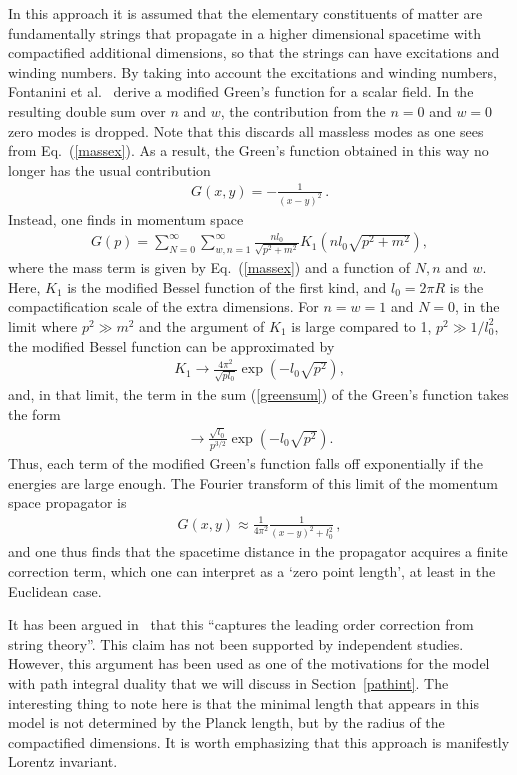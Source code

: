 \documentclass{article}
\def\beqn{\begin{eqnarray}}
\def\eeqn{\end{eqnarray}}
\begin{document}
In this approach it is assumed that the elementary constituents of matter are fundamentally strings 
that propagate in a higher dimensional spacetime with compactified additional dimensions, so that the strings
can have excitations and winding numbers. By taking into account the 
excitations and winding numbers, Fontanini et al.~\cite{Smailagic:2003hm,Fontanini:2005ik,Spallucci:2005bm} 
derive a modified Green's function for a
scalar field. In the resulting double sum over $n$ and $w$, the contribution from the $n=0$
and $w=0$ zero modes is dropped. Note that this discards all massless modes as one sees from Eq.~(\ref{massex}). 
As a result, the Green's function obtained in this way 
no longer has the usual contribution
\beqn
G(x,y) = - \frac{1}{(x-y)^2} \,.
\eeqn
Instead, one finds in momentum space
\beqn
G(p) = \sum_{N=0}^\infty \sum_{w,n=1}^\infty \frac{n l_0}{\sqrt{p^2 +
    m^2}} K_1 \left( n l_0 \sqrt{p^2 + m^2} \right) , \label{greensum}
\eeqn
where the mass term is given by Eq.~(\ref{massex}) and a function of $N,n$ and $w$. 
Here, $K_1$ is the modified Bessel function of the first kind, and $l_0 = 2\pi R$ is the compactification scale of the extra dimensions.
For $n=w=1$ and $N=0$, in the limit where $p^2 \gg m^2$ and the argument of $K_1$ is large compared to 1, $p^2 \gg 1/l^2_0$, the modified Bessel function can
be approximated by
\beqn
K_1 \to \frac{4 \pi^2}{\sqrt{p l_0}}  \exp \left( -l_0 \sqrt{p^2} \right),
\eeqn
and, in that limit, the term in the sum (\ref{greensum}) of the Green's function takes the form 
\beqn
\to \frac{\sqrt{l_0}}{p^{3/2}} \exp \left (-l_0 \sqrt{p^2} \right) .
\eeqn
Thus, each term of the modified Green's function falls off exponentially if the energies are large enough. 
The Fourier transform of this limit of the momentum space propagator is
\beqn
G(x,y) \approx \frac{1}{4 \pi^2} \frac{1}{(x-y)^2 + l_0^2} \,, \label{greens}
\eeqn
and one thus finds that the spacetime distance in the propagator acquires a finite correction term, which one can
interpret as a `zero point length', at least in the Euclidean case. 

It has been argued in~\cite{Smailagic:2003hm} that this ``captures the leading order correction from string theory''. 
This claim has not been supported by independent studies. However, this argument has been used as one of the motivations
for the model with path integral duality that we will discuss in Section~\ref{pathint}. The interesting thing to note here is
that the minimal length that appears in this model is not determined by the Planck length, but by the radius of
the compactified dimensions. It is worth emphasizing that this approach is manifestly Lorentz invariant.
\end{document}
